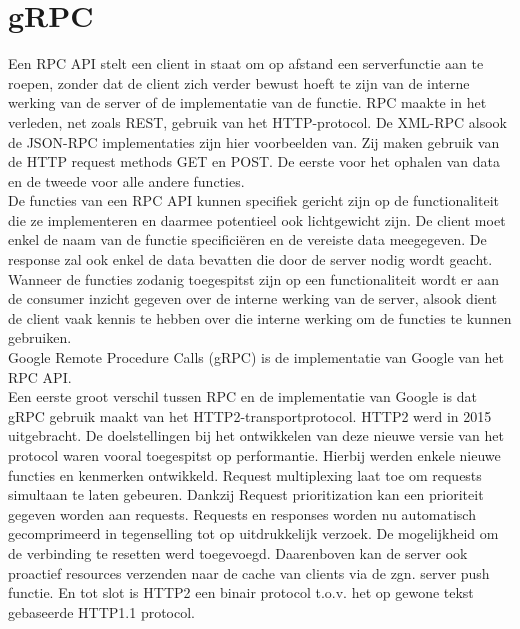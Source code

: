 \section{gRPC}

Een RPC API stelt een client in staat om op afstand een serverfunctie aan te roepen, zonder dat de client zich verder bewust hoeft te zijn van de interne werking
van de server of de implementatie van de functie.
RPC maakte in het verleden, net zoals REST, gebruik van het HTTP-protocol. De XML-RPC alsook de JSON-RPC implementaties zijn hier voorbeelden van.
Zij maken gebruik van de HTTP request methods GET en POST. De eerste voor het ophalen van data en de tweede voor alle andere functies.\\

De functies van een RPC API kunnen specifiek gericht zijn op de functionaliteit die ze implementeren en daarmee potentieel ook lichtgewicht zijn.
De client moet enkel de naam van de functie specifici\"eren en de vereiste data meegegeven. De response zal ook enkel de data bevatten die door de server nodig wordt geacht.
Wanneer de functies zodanig toegespitst zijn op een functionaliteit wordt er aan de consumer inzicht gegeven over de interne werking van de server,
alsook dient de client vaak kennis te hebben over die interne werking om de functies te kunnen gebruiken.\newline
~\autocite{altexsoft}\\

Google Remote Procedure Calls (gRPC) is de implementatie van Google van het RPC API.\\
Een eerste groot verschil tussen RPC en de implementatie van Google is dat gRPC gebruik maakt van het HTTP2-transportprotocol.
HTTP2 werd in 2015 uitgebracht. De doelstellingen bij het ontwikkelen van deze nieuwe versie van het protocol waren vooral toegespitst op performantie.
Hierbij werden enkele nieuwe functies en kenmerken ontwikkeld. Request multiplexing laat toe om requests simultaan te laten gebeuren.
Dankzij Request prioritization kan een prioriteit gegeven worden aan requests. Requests en responses worden nu automatisch gecomprimeerd in tegenselling tot op
uitdrukkelijk verzoek. De mogelijkheid om de verbinding te resetten werd toegevoegd. Daarenboven kan de server ook proactief resources verzenden naar de
cache van clients via de zgn. server push functie. En tot slot is HTTP2 een binair protocol t.o.v. het op gewone tekst gebaseerde HTTP1.1 protocol.\newline
~\autocite{baeldung}\\

